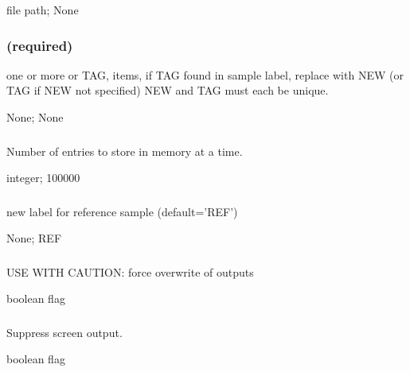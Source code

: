 \documentclass[letterpaper,11pt,english]{sphinxmanual}
\begin{document}
 file path;  None


\subsubsection{ (required)}
\label{\detokenize{prog_desc:sample-tags-sampletags-required}}
 one or more  or TAG, items, if TAG found in sample label, replace with NEW (or TAG if NEW not specified) NEW and TAG must each be unique.

 None;  None


\subsubsection{}
\label{\detokenize{prog_desc:id10}}
 Number of entries to store in memory at a time.

 integer;  100000


\subsubsection{}
\label{\detokenize{prog_desc:mvf-ref-label-mvfreflabel}}
 new label for reference sample (default=’REF’)

 None;  REF


\subsubsection{}
\label{\detokenize{prog_desc:id11}}
 USE WITH CAUTION: force overwrite of outputs

 boolean flag


\subsubsection{}
\label{\detokenize{prog_desc:id12}}
 Suppress screen output.

 boolean flag
\end{document}
